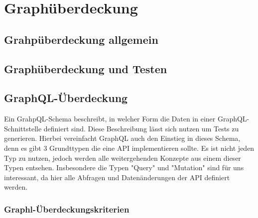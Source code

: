 \section{Graphüberdeckung}

\subsection{Grahpüberdeckung allgemein}

\subsection{Graphüberdeckung und Testen}

\subsection{GraphQL-Überdeckung}

Ein GrahpQL-Schema beschreibt, in welcher Form die Daten in einer GraphQL-Schnittstelle definiert sind.
Diese Beschreibung lässt sich nutzen um Tests zu generieren.
Hierbei vereinfacht GraphQL auch den Einstieg in dieses Schema, denn es gibt 3 Grundttypen die eine
API implementieren sollte. Es ist nicht jeden Typ zu nutzen, jedoch werden alle weitergehenden Konzepte aus
einem dieser Typen entsehen. Insbesondere die Typen "Query" und "Mutation" sind für uns interessant, da hier alle Abfragen und
Datenänderungen der API definiert werden.



\subsubsection*{Graphl-Überdeckungskriterien}
